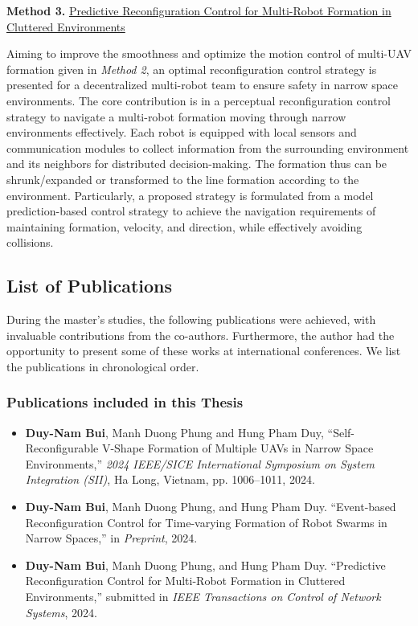 \noindent \textbf{Method 3.} \hyperref[paper3]{Predictive Reconfiguration Control for Multi-Robot Formation in Cluttered Environments}

Aiming to improve the smoothness and optimize the motion control of multi-UAV formation given in \textit{Method 2}, an optimal reconfiguration control strategy is presented for a decentralized multi-robot team to ensure safety in narrow space environments. The core contribution is in a perceptual reconfiguration control strategy to navigate a multi-robot formation moving through narrow environments effectively. Each robot is equipped with local sensors and communication modules to collect information from the surrounding environment and its neighbors for distributed decision-making. The formation thus can be shrunk/expanded or transformed to the line formation according to the environment. Particularly, a proposed strategy is formulated from a model prediction-based control strategy to achieve the navigation requirements of maintaining formation, velocity, and direction, while effectively avoiding collisions.

\subsection{List of Publications}\label{sec22}
During the master's studies, the following publications were achieved, with invaluable contributions from the co-authors. Furthermore, the author had the opportunity to present some of these works at international conferences. We list the publications in chronological order.
\subsubsection{Publications included in this Thesis}
\begin{itemize}
    \item \textbf{Duy-Nam Bui}, Manh Duong Phung and Hung Pham Duy, ``Self-Reconfigurable V-Shape Formation of Multiple UAVs in Narrow Space Environments,'' \textit{2024 IEEE/SICE International Symposium on System Integration (SII)}, Ha Long, Vietnam, pp. 1006--1011, 2024.
        \item \textbf{Duy-Nam Bui}, Manh Duong Phung, and Hung Pham Duy. ``Event-based Reconfiguration Control for Time-varying Formation of Robot Swarms in Narrow Spaces,'' in \textit{Preprint}, 2024.
    \item \textbf{Duy-Nam Bui}, Manh Duong Phung, and Hung Pham Duy. ``Predictive Reconfiguration Control for Multi-Robot Formation in Cluttered Environments,'' submitted in \textit{IEEE Transactions on Control of Network Systems}, 2024.
\end{itemize}
